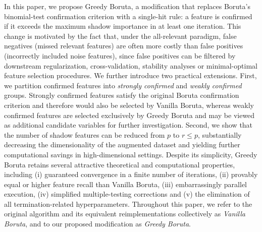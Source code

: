 \documentclass[runningheads]{llncs}
\begin{document}
In this paper, we propose Greedy Boruta, a modification that replaces Boruta's binomial-test confirmation criterion with a single-hit rule: a feature is confirmed if it exceeds the maximum shadow importance in at least one iteration. This change is motivated by the fact that, under the all-relevant paradigm, false negatives (missed relevant features) are often more costly than false positives (incorrectly included noise features), since false positives can be filtered by downstream regularization, cross-validation, stability analyses or minimal-optimal feature selection procedures. We further introduce two practical extensions. First, we partition confirmed features into \emph{strongly confirmed} and \emph{weakly confirmed} groups. Strongly confirmed features satisfy the original Boruta confirmation criterion and therefore would also be selected by Vanilla Boruta, whereas weakly confirmed features are selected exclusively by Greedy Boruta and may be viewed as additional candidate variables for further investigation. Second, we show that the number of shadow features can be reduced from $p$ to $r \leq p$, substantially decreasing the dimensionality of the augmented dataset and yielding further computational savings in high-dimensional settings. Despite its simplicity, Greedy Boruta retains several attractive theoretical and computational properties, including (i) guaranteed convergence in a finite number of iterations, (ii) provably equal or higher feature recall than Vanilla Boruta, (iii) embarrassingly parallel execution, (iv) simplified multiple-testing corrections and (v) the elimination of all termination-related hyperparameters. Throughout this paper, we refer to the original algorithm and its equivalent reimplementations collectively as \emph{Vanilla Boruta}, and to our proposed modification as \emph{Greedy Boruta}.
\end{document}
